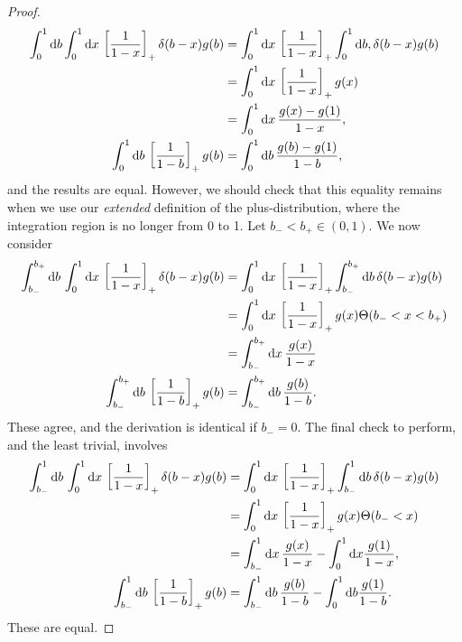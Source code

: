 \begin{subappendices}
\begin{example}{}
\begin{proof}
\begin{align}
    \int_0^1 \dd b \int_{0}^{1} \dd x\,\left[\frac{1}{1-x}\right]_+ \delta(b - x) g(b)
    &=
    \int_{0}^{1} \dd x\,\left[\frac{1}{1-x}\right]_+ \int_0^1 \dd b,\delta(b - x) g(b)
    \\
    \notag
    &=
    \int_{0}^{1} \dd x\,\left[\frac{1}{1-x}\right]_+ g(x)
    \\
    \notag
    &=
    \int_{0}^{1} \dd x\,\frac{g(x) - g(1)}{1-x}
    ,
    \\
    \int_0^1 \dd b \,\left[\frac{1}{1-b}\right]_+ g(b) &= \int_0^1 \dd b\, \frac{g(b) - g(1)}{1-b}
    ,
\end{align}
and the results are equal.
%
However, we should check that this equality remains when we use our \textit{extended} definition of the plus-distribution, where the integration region is no longer from 0 to 1.
%
Let \(b_- < b_+ \in (0,1)\).
%
We now consider
\begin{align}
    \int_{b_-}^{b_+}\dd b\,
    \int_0^1 \dd x\,
    \left[\frac{1}{1-x}\right]_+
    \delta(b - x) g(b)
    &=
    \int_{0}^1 \dd x\,
    \left[\frac{1}{1-x}\right]_+
    \int_{b_-}^{b_+}\dd b\,
    \delta(b - x) g(b)
    \\
    &=
    \notag
    \int_0^1 \dd x\,
    \left[\frac{1}{1-x}\right]_+ g(x) \Theta(b_- < x < b_+)
    \\
    &=
    \notag
    \int_{b_-}^{b_+} \dd x\, \frac{g(x)}{1-x}
    \\
    \int_{b_-}^{b_+}\dd b\,
    \left[\frac{1}{1-b}\right]_+ g(b)
    &=
    \int_{b_-}^{b_+} \dd b\, \frac{g(b)}{1-b}
    .
\end{align}
These agree, and the derivation is identical if \(b_- = 0\).
%
The final check to perform, and the least trivial, involves
\begin{align}
    \int_{b_-}^{1} \dd b \,
    \int_{0}^1 \dd x\,
    \left[\frac{1}{1-x}\right]_+
    \delta(b - x) g(b)
    &=
    \int_{0}^1 \dd x\,
    \left[\frac{1}{1-x}\right]_+
    \int_{b_-}^{1} \dd b\,
    \delta(b - x) g(b)
    \\
    &=
    \notag
    \int_0^1 \dd x\,
    \left[\frac{1}{1-x}\right]_+
    g(x) \Theta(b_- < x )
    \\
    &=
    \notag
    \int_{b_-}^{1} \dd x\, \frac{g(x)}{1-x}
    -
    \int_0^1 \dd x \frac{g(1)}{1-x}
    ,
    \\
    \int_{b_-}^{1} \dd b\,
    \left[\frac{1}{1-b}\right]_+ g(b)
    &=
    \int_{b_-}^{1} \dd b\, \frac{g(b)}{1-b}
    -
    \int_0^1 \dd b \frac{g(1)}{1-b}
    .
\end{align}
These are equal.
\end{proof}


\end{example}
\end{subappendices}

